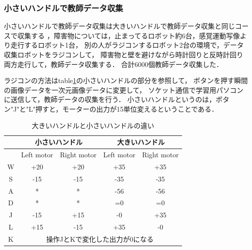 \subsubsection{小さいハンドルで教師データ収集}
小さいハンドルで教師データ収集は大きいハンドルで教師データ収集と同じコースで収集する
，障害物については，止まってるロボット約6台，感覚運動写像より走行するロボット1台，
別の人がラジコンするロボット2台の環境で，データ収集ロボットをラジコンして，
障害物と壁を避けながら時計回りと反時計回り両方走行して，教師データ収集する．
合計6000個教師データ収集した．

ラジコンの方法はtable\ref{radio_rule}の小さいハンドルの部分を参照して，
ボタンを押す瞬間の画像データを一次元画像データに変更して，
ソケット通信で学習用パソコンに送信して，教師データの収集を行う．
小さいハンドルというのは，ボタン"J"と"L"押すと，モーターの出力が15単位変えるということである．

\begin{table}[!ht]
\setlength\tabcolsep{1pt}
\begin{center}
\begin{tabular}{|c|c|c|c|c|}
\hline
 & \multicolumn{2}{|c|}{小さいハンドル} & \multicolumn{2}{c|}{大きいハンドル}\\
\hline
 & Left motor & Right motor & Left motor & Right motor \\
\hline
W & +20 & +20 & +35 & +35\\
\hline
S & -15 & -15 & -35 & -35\\
\hline
A & * & * & -56 & -56\\
\hline
D & * & * & =0 & =0 \\
\hline
J & -15 & +15 & -0 & +35 \\
\hline
L & +15 & -15 & +35 & -0 \\
\hline
K & \multicolumn{4}{|c|}{操作JとKで変化した出力が0になる} \\
\hline
\end{tabular}
\end{center}
\caption{
大きいハンドルと小さいハンドルの違い
}
\label{radio_rule}
\end{table}



